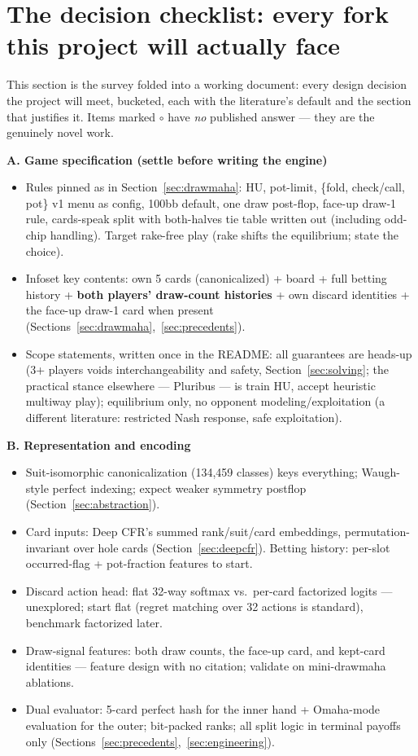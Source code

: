 \section{The decision checklist: every fork this project will actually face}\label{sec:checklist}

This section is the survey folded into a working document: every design decision the project will meet, bucketed, each with the literature's default and the section that justifies it. Items marked $\circ$ have \emph{no} published answer --- they are the genuinely novel work.

\textbf{A. Game specification (settle before writing the engine)}
\begin{itemize}
\item Rules pinned as in Section~\ref{sec:drawmaha}: HU, pot-limit, \{fold, check/call, pot\} v1 menu as config, 100bb default, one draw post-flop, face-up draw-1 rule, cards-speak split with both-halves tie table written out (including odd-chip handling). Target rake-free play (rake shifts the equilibrium; state the choice).
\item Infoset key contents: own 5 cards (canonicalized) + board + full betting history + \textbf{both players' draw-count histories} + own discard identities + the face-up draw-1 card when present (Sections~\ref{sec:drawmaha},~\ref{sec:precedents}).
\item Scope statements, written once in the README: all guarantees are heads-up (3+ players voids interchangeability and safety, Section~\ref{sec:solving}; the practical stance elsewhere --- Pluribus --- is train HU, accept heuristic multiway play); equilibrium only, no opponent modeling/exploitation (a different literature: restricted Nash response, safe exploitation).
\end{itemize}

\textbf{B. Representation and encoding}
\begin{itemize}
\item Suit-isomorphic canonicalization (134{,}459 classes) keys everything; Waugh-style perfect indexing; expect weaker symmetry postflop (Section~\ref{sec:abstraction}).
\item Card inputs: Deep CFR's summed rank/suit/card embeddings, permutation-invariant over hole cards (Section~\ref{sec:deepcfr}). Betting history: per-slot occurred-flag + pot-fraction features to start.
\item[$\circ$] Discard action head: flat 32-way softmax vs.\ per-card factorized logits --- unexplored; start flat (regret matching over 32 actions is standard), benchmark factorized later.
\item[$\circ$] Draw-signal features: both draw counts, the face-up card, and kept-card identities --- feature design with no citation; validate on mini-drawmaha ablations.
\item Dual evaluator: 5-card perfect hash for the inner hand + Omaha-mode evaluation for the outer; bit-packed ranks; all split logic in terminal payoffs only (Sections~\ref{sec:precedents},~\ref{sec:engineering}).
\end{itemize}

